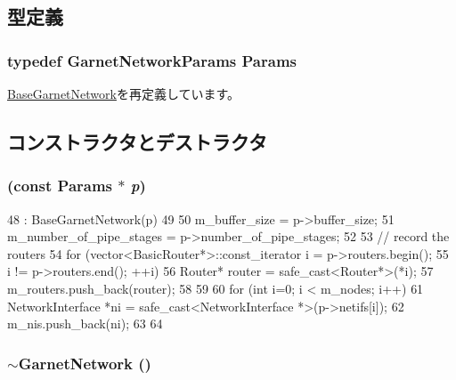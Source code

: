 \subsection{型定義}
\hypertarget{classGarnetNetwork_af1f02e00eac1bf3521780f99a28259a5}{
\subsubsection[{Params}]{\setlength{\rightskip}{0pt plus 5cm}typedef GarnetNetworkParams {\bf Params}}}
\label{classGarnetNetwork_af1f02e00eac1bf3521780f99a28259a5}


\hyperlink{classBaseGarnetNetwork_a9b387eae2084a167c00ec5550159a245}{BaseGarnetNetwork}を再定義しています。

\subsection{コンストラクタとデストラクタ}
\hypertarget{classGarnetNetwork_a6af3413f2d3550ac59fe1970d3b63972}{
\subsubsection[{GarnetNetwork}]{ (const {\bf Params} $\ast$ {\em p})}}
\label{classGarnetNetwork_a6af3413f2d3550ac59fe1970d3b63972}



\begin{DoxyCode}
48     : BaseGarnetNetwork(p)
49 {
50     m_buffer_size = p->buffer_size;
51     m_number_of_pipe_stages = p->number_of_pipe_stages;
52 
53     // record the routers
54     for (vector<BasicRouter*>::const_iterator i = p->routers.begin();
55          i != p->routers.end(); ++i) {
56         Router* router = safe_cast<Router*>(*i);
57         m_routers.push_back(router);
58     }
59 
60     for (int i=0; i < m_nodes; i++) {
61         NetworkInterface *ni = safe_cast<NetworkInterface *>(p->netifs[i]);
62         m_nis.push_back(ni);
63     }
64 }
\end{DoxyCode}
\hypertarget{classGarnetNetwork_a4bffba7842c2ab1ee504e3effcb14a40}{
\subsubsection[{$\sim$GarnetNetwork}]{\setlength{\rightskip}{0pt plus 5cm}$\sim${\bf GarnetNetwork} ()}}
\label{classGarnetNetwork_a4bffba7842c2ab1ee504e3effcb14a40}



